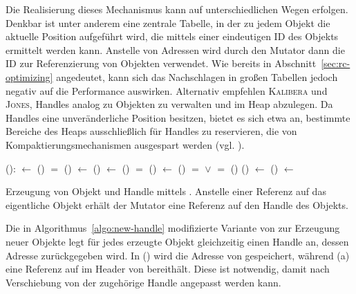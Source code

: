 Die Realisierung dieses Mechanismus kann auf unterschiedlichen Wegen erfolgen.
Denkbar ist unter anderem eine zentrale Tabelle, in der zu jedem Objekt die aktuelle Position aufgeführt wird, die mittels einer eindeutigen ID des Objekts ermittelt werden kann.
Anstelle von Adressen wird durch den Mutator dann die ID zur Referenzierung von Objekten verwendet.
Wie bereits in Abschnitt~\ref{sec:rc-optimizing} angedeutet, kann sich das Nachschlagen in großen Tabellen jedoch negativ auf die Performance auswirken.
Alternativ empfehlen \textsc{Kalibera} und \textsc{Jones}, Handles analog zu Objekten zu verwalten und im Heap abzulegen.
Da Handles eine unveränderliche Position besitzen, bietet es sich etwa an, bestimmte Bereiche des Heaps ausschließlich für Handles zu reservieren, die von Kompaktierungsmechanismen ausgespart werden (vgl. \cite[S. 90f]{kalibera2011}).

\begin{algorithm}
\begin{algorithmic}[1]
	\State {}():
	\State \quad {} $\gets$ ()	
	\State \quad \IF {} $=$ \Null
	\State \quad \quad {}()
	\State \quad \quad {} $\gets$ ()
	\State \quad {} $\gets$ ()	
	\State \quad \IF {} $=$ \Null
	\State \quad \quad {}()
	\State \quad \quad {} $\gets$ ()	
	\State \quad \IF {} $=$ \Null $\vee$  $=$ \Null
	\State \quad \quad {}()
	\State \quad {}() $\gets$ 		
	\State \quad {}() $\gets$ 		
	\State \quad \Return {}	
\end{algorithmic}
\caption[Erzeugung von Objekt und Handle mittels ]{Erzeugung von Objekt und Handle mittels . Anstelle einer Referenz auf das eigentliche Objekt erhält der Mutator eine Referenz auf den Handle des Objekts.}
\label{algo:new-handle}
\end{algorithm}

Die in Algorithmus~\ref{algo:new-handle} modifizierte Variante von  zur Erzeugung neuer Objekte legt für jedes erzeugte Objekt  gleichzeitig einen Handle  an, dessen Adresse zurückgegeben wird.
In () wird die Adresse von  gespeichert, während (a) eine Referenz auf  im Header von  bereithält.
Diese ist notwendig, damit nach Verschiebung von  der zugehörige Handle angepasst werden kann.

